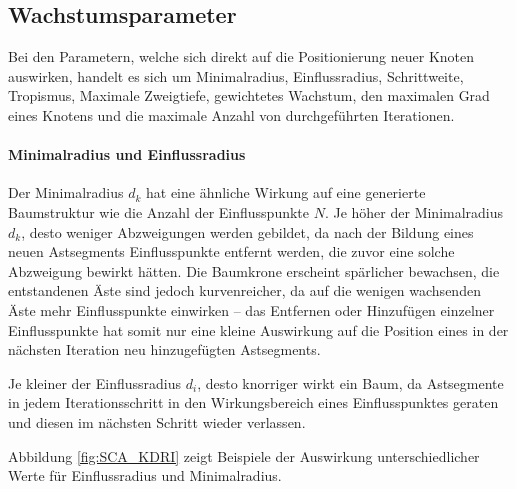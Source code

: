 \subsection{Wachstumsparameter}

Bei den Parametern, welche sich direkt auf die Positionierung neuer Knoten auswirken, handelt es sich um Minimalradius, Einflussradius, Schrittweite, Tropismus, Maximale Zweigtiefe, gewichtetes Wachstum, den maximalen Grad eines Knotens und die maximale Anzahl von durchgeführten Iterationen.

\paragraph{Minimalradius und Einflussradius}

Der Minimalradius $d_k$ hat eine ähnliche Wirkung auf eine generierte Baumstruktur wie die Anzahl der Einflusspunkte $N$. Je höher der Minimalradius $d_k$, desto weniger Abzweigungen werden gebildet, da nach der Bildung eines neuen Astsegments Einflusspunkte entfernt werden, die zuvor eine solche Abzweigung bewirkt hätten. Die Baumkrone erscheint spärlicher bewachsen, die entstandenen Äste sind jedoch kurvenreicher, da auf die wenigen wachsenden Äste mehr Einflusspunkte einwirken -- das Entfernen oder Hinzufügen einzelner Einflusspunkte hat somit nur eine kleine Auswirkung auf die Position eines in der nächsten Iteration neu hinzugefügten Astsegments. \cite[S.3]{SpaceColonizationAlgorithm:07}

Je kleiner der Einflussradius $d_i$, desto knorriger wirkt ein Baum, da Astsegmente in jedem Iterationsschritt in den Wirkungsbereich eines Einflusspunktes geraten und diesen im nächsten Schritt wieder verlassen. \cite[S.4]{SpaceColonizationAlgorithm:07}

Abbildung \ref{fig:SCA_KDRI} zeigt Beispiele der Auswirkung unterschiedlicher Werte für Einflussradius und Minimalradius.

